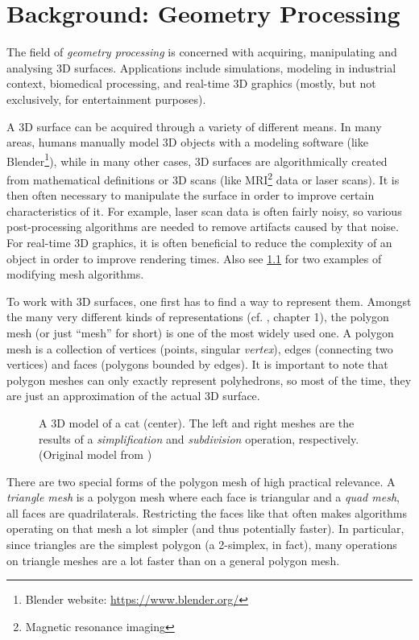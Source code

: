 \chapter{Background: Geometry Processing}

The field of \emph{geometry processing} is concerned with acquiring, manipulating and analysing 3D surfaces.
Applications include simulations, modeling in industrial context, biomedical processing, and real-time 3D graphics (mostly, but not exclusively, for entertainment purposes).

A 3D surface can be acquired through a variety of different means.
In many areas, humans manually model 3D objects with a modeling software (like Blender\footnote{Blender website: \url{https://www.blender.org/}}), while in many other cases, 3D surfaces are algorithmically created from mathematical definitions or 3D scans (like MRI\footnote{Magnetic resonance imaging} data or laser scans).
It is then often necessary to manipulate the surface in order to improve certain characteristics of it.
For example, laser scan data is often fairly noisy, so various post-processing algorithms are needed to remove artifacts caused by that noise.
For real-time 3D graphics, it is often beneficial to reduce the complexity of an object in order to improve rendering times.
Also see \ref{fig:cat-algo} for two examples of modifying mesh algorithms.

To work with 3D surfaces, one first has to find a way to represent them.
Amongst the many very different kinds of representations (cf. \cite{botsch2010polygon}, chapter 1), the polygon mesh (or just \enquote{mesh} for short) is one of the most widely used one.
A polygon mesh is a collection of vertices (points, singular \emph{vertex}), edges (connecting two vertices) and faces (polygons bounded by edges).
It is important to note that polygon meshes can only exactly represent polyhedrons, so most of the time, they are just an approximation of the actual 3D surface.

\begin{figure}[b]
  
  \caption{A 3D model of a cat (center).
  The left and right meshes are the results of a \emph{simplification} and \emph{subdivision} operation, respectively.
  (Original model from \cite{catmodel})}
  \label{fig:cat-algo}
\end{figure}

There are two special forms of the polygon mesh of high practical relevance.
A \emph{triangle mesh} is a polygon mesh where each face is triangular and a \emph{quad mesh}, all faces are quadrilaterals.
Restricting the faces like that often makes algorithms operating on that mesh a lot simpler (and thus potentially faster).
In particular, since triangles are the simplest polygon (a 2-simplex, in fact), many operations on triangle meshes are a lot faster than on a general polygon mesh.

